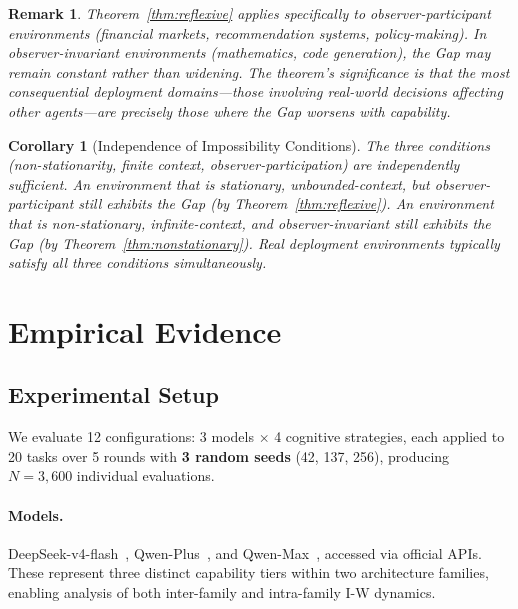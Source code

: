 \documentclass{article}
\newtheorem{corollary}{Corollary}
\newtheorem{remark}{Remark}
\begin{document}
\begin{remark}
Theorem~\ref{thm:reflexive} applies specifically to observer-participant
environments (financial markets, recommendation systems, policy-making).
In observer-invariant environments (mathematics, code generation), the
Gap may remain constant rather than widening. The theorem's significance
is that the most consequential deployment domains---those involving real-world
decisions affecting other agents---are precisely those where the Gap
worsens with capability.
\end{remark}

\begin{corollary}[Independence of Impossibility Conditions]
\label{cor:independence}
The three conditions (non-stationarity, finite context, observer-participation)
are independently sufficient. An environment that is stationary,
unbounded-context, but observer-participant still exhibits the Gap
(by Theorem~\ref{thm:reflexive}). An environment that is non-stationary,
infinite-context, and observer-invariant still exhibits the Gap
(by Theorem~\ref{thm:nonstationary}). Real deployment environments
typically satisfy all three conditions simultaneously.
\end{corollary}


\section{Empirical Evidence}
\label{sec:empirical}

\subsection{Experimental Setup}

We evaluate 12 configurations: 3 models $\times$ 4 cognitive strategies,
each applied to 20 tasks over 5 rounds with \textbf{3 random seeds}
(42, 137, 256), producing $N{=}3{,}600$ individual evaluations.

\paragraph{Models.} DeepSeek-v4-flash~\cite{deepseek},
Qwen-Plus~\cite{qwen}, and Qwen-Max~\cite{qwen}, accessed via official APIs.
These represent three distinct capability tiers within two architecture
families, enabling analysis of both inter-family and intra-family I-W dynamics.
\end{document}
